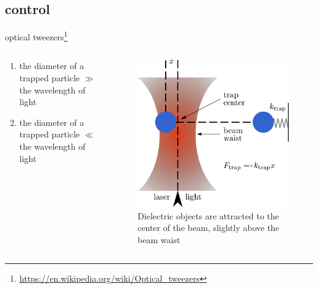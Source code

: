\documentclass[18 pt]{beamer}
\begin{document}
\subsection{control}
\begin{frame}{optical tweezers\footnote{\url{https://en.wikipedia.org/wiki/Optical_tweezers}}}
  \begin{columns} %

    \begin{column}{.5\textwidth} %
    \begin{enumerate}[label=\arabic*., leftmargin=*, itemsep=30pt] %
        \item the diameter of a trapped particle $\gg $ the wavelength of light
        \item the diameter of a trapped particle $\ll$ the wavelength of light
    \end{enumerate}
    \end{column}
    
    \begin{column}{.5\textwidth} %
    \begin{figure}
      \centering
    \includegraphics[width=\textwidth]{IMG/Optical_trap_prinple} %
    \caption{Dielectric objects are attracted to the center of the beam, slightly above the beam waist}
    \end{figure}
    \end{column}
    
  \end{columns}
\end{frame}
\end{document}
